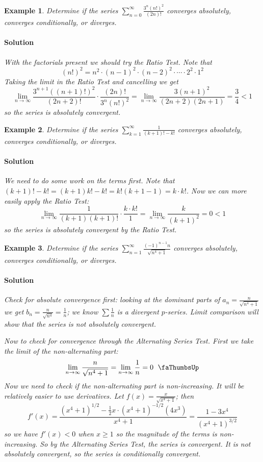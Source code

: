 \documentclass[letterpaper, 11pt, openany]{book}
\theoremstyle{mytheoremstyle}
\theoremstyle{myexamplestyle}
\newtheorem{example}{Example}[section]
\newenvironment{solution}{\paragraph{\sffamily \smaller \fontseries{b}\selectfont Solution}}{\hfill\faSquare}
\begin{document}
\begin{example}\label{e:series-tests-fact}
    Determine if the series $\displaystyle \sum_{n=0}^{\infty} \frac{3^{n}(n!)^{2}}{(2n)!}$ converges absolutely, converges conditionally, or diverges.
    \begin{solution}
        With the factorials present we should try the Ratio Test. Note that
        \[(n!)^{2} = n^{2} \cdot (n-1)^{2} \cdot (n-2)^{2} \cdot \cdots \cdot 2^{2} \cdot 1^{2}\]
        Taking the limit in the Ratio Test and cancelling we get
        \[\lim_{n \to \infty} \frac{3^{n+1}((n+1)!)^{2}}{(2n+2)!} \cdot \frac{(2n)!}{3^{n}(n!)^{2}} = \lim_{n \to \infty} \frac{3(n+1)^{2}}{(2n+2)(2n+1)} = \frac{3}{4} < 1\]
        so the series is absolutely convergent.
    \end{solution}
\end{example}

\begin{example}\label{e:series-tests-factorial-diff}
    Determine if the series $\displaystyle \sum_{k=1}^{\infty} \frac{1}{(k+1)! - k!}$ converges absolutely, converges conditionally, or diverges.
    \begin{solution}
        We need to do some work on the terms first. Note that $(k+1)! - k! = (k+1)k! - k! = k!(k+1-1) = k \cdot k!$. Now we can more easily apply the Ratio Test:
        \[\lim_{n \to \infty} \frac{1}{(k+1)(k+1)!} \cdot \frac{k \cdot k!}{1} = \lim_{n \to \infty} \frac{k}{(k+1)^{2}} = 0 < 1\]
        so the series is absolutely convergent by the Ratio Test.
    \end{solution}
\end{example}

\begin{example}\label{e:seriestestssqrt}
    Determine if the series $\displaystyle \sum_{n=1}^{\infty} \frac{(-1)^{n-1}n}{\sqrt{n^{4} + 1}}$ converges absolutely, converges conditionally, or diverges.

\begin{solution}
    Check for absolute convergence first: looking at the dominant parts of $a_{n} = \frac{n}{\sqrt{n^{4} + 1}}$ we get $b_{n} = \frac{n}{\sqrt{n^{4}}} = \frac{1}{n}$; we know $\sum \frac{1}{n}$ is a divergent $p$-series. Limit comparison will show that the series is not absolutely convergent.

    Now to check for convergence through the Alternating Series Test. First we take the limit of the non-alternating part:
    \[\lim_{n \to \infty} \frac{n}{\sqrt{n^{4} + 1}} = \lim_{n \to \infty} \frac{1}{n} = 0 \text{\; \faThumbsUp}\]
    Now we need to check if the non-alternating part is non-increasing. It will be relatively easier to use derivatives. Let $\displaystyle f(x) = \frac{x}{\sqrt{x^{4} + 1}}$; then
    \[f'(x) = \frac{(x^{4} + 1)^{1/2} - \frac{1}{2}x\cdot(x^{4} + 1)^{-1/2}(4x^{3})}{x^{4} + 1} = \frac{1-3x^{4}}{(x^{4} + 1)^{3/2}}\]
    so we have $f'(x) < 0$ when $x \geq 1$ so the magnitude of the terms is non-increasing. So by the Alternating Series Test, the series is convergent. It is not absolutely convergent, so the series is conditionally convergent.
\end{solution}
\end{example}
\end{document}
